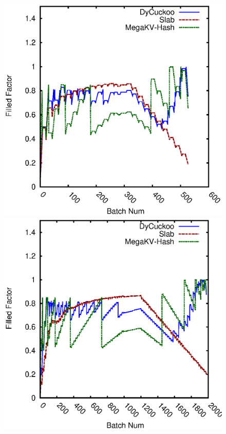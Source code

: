 \begin{figure}[htp]
	\begin{minipage}{0.19\linewidth}\centering
		\includegraphics[width=\linewidth]{pic/dynamic-load_factor/twitter/batch_LoadFactor-2.eps}
		\centerline{\dstwitter}
	\end{minipage}
	\begin{minipage}{0.19\linewidth}\centering
		\includegraphics[width=\linewidth]{pic/dynamic-load_factor/reddit/batch_LoadFactor-2.eps}

\end{minipage}
\end{figure}
